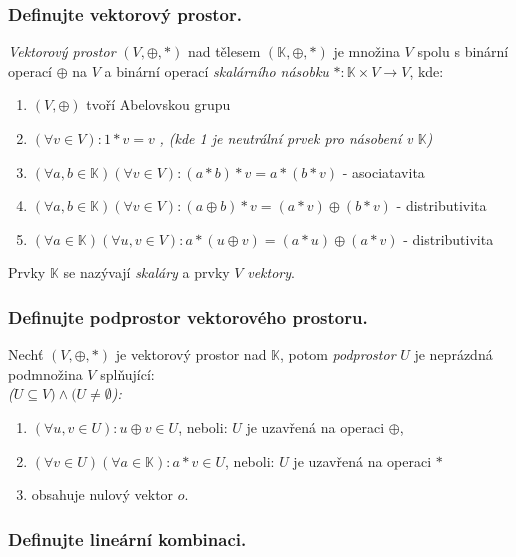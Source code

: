 \documentclass[10pt,a4paper]{article}
\begin{document}
\subsubsection{Definujte vektorový prostor.}

\textit{Vektorový prostor} $(V, \oplus, *)$ nad tělesem $(\mathbb{K}, \oplus, *)$ je množina $V$ spolu s binární operací $\oplus$ na $V$ a binární operací \textit{skalárního násobku} $*: \mathbb{K} \times V \to V$, kde:

\begin{enumerate}[label=(\roman*)]
\item $(V, \oplus)$ tvoří Abelovskou grupu
\item $(\forall v \in V): 1 * v = v$ \textit{, (kde 1 je neutrální prvek pro násobení v $\mathbb{K}$)}
\item $(\forall a,b \in \mathbb{K})(\forall v \in V): (a * b) * v = a * (b * v)$ - asociatavita
\item $(\forall a,b \in \mathbb{K})(\forall v \in V): (a \oplus b) * v = (a * v) \oplus (b * v)$  - distributivita
\item $(\forall a \in \mathbb{K})(\forall u,v \in V): a * (u \oplus v) = (a * u) \oplus (a * v)$ - distributivita
\end{enumerate}
Prvky $\mathbb{K}$ se nazývají \textit{skaláry} a prvky $V$ \textit{vektory}.

\subsubsection{Definujte podprostor vektorového prostoru.}

Nechť $(V, \oplus, *)$ je vektorový prostor nad $\mathbb{K}$, potom \textit{podprostor} $U$ je neprázdná podmnožina $V$ splňující:\\
\textit{($U \subseteq V) \land (U \neq \emptyset$):}
\begin{enumerate}
\item $(\forall u, v \in U): u \oplus v \in U$, neboli: $U$ je uzavřená na operaci $\oplus$,
\item $(\forall v \in U)(\forall a \in \mathbb{K}): a*v \in U$, neboli: $U$ je uzavřená na operaci $*$
\item obsahuje nulový vektor $o$.
\end{enumerate}

\subsubsection{Definujte lineární kombinaci.}
\end{document}

